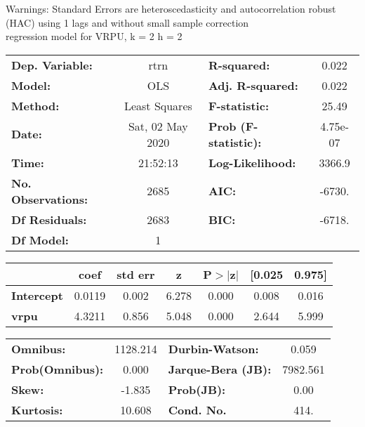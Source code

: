 Warnings: \newline
 [1] Standard Errors are heteroscedasticity and autocorrelation robust (HAC) using 1 lags and without small sample correction\\ 

regression model for VRPU, k = 2 h = 2\begin{center}
\begin{tabular}{lclc}
\toprule
\textbf{Dep. Variable:}    &       rtrn       & \textbf{  R-squared:         } &     0.022   \\
\textbf{Model:}            &       OLS        & \textbf{  Adj. R-squared:    } &     0.022   \\
\textbf{Method:}           &  Least Squares   & \textbf{  F-statistic:       } &     25.49   \\
\textbf{Date:}             & Sat, 02 May 2020 & \textbf{  Prob (F-statistic):} &  4.75e-07   \\
\textbf{Time:}             &     21:52:13     & \textbf{  Log-Likelihood:    } &    3366.9   \\
\textbf{No. Observations:} &        2685      & \textbf{  AIC:               } &    -6730.   \\
\textbf{Df Residuals:}     &        2683      & \textbf{  BIC:               } &    -6718.   \\
\textbf{Df Model:}         &           1      & \textbf{                     } &             \\
\bottomrule
\end{tabular}
\begin{tabular}{lcccccc}
                   & \textbf{coef} & \textbf{std err} & \textbf{z} & \textbf{P$> |$z$|$} & \textbf{[0.025} & \textbf{0.975]}  \\
\midrule
\textbf{Intercept} &       0.0119  &        0.002     &     6.278  &         0.000        &        0.008    &        0.016     \\
\textbf{vrpu}      &       4.3211  &        0.856     &     5.048  &         0.000        &        2.644    &        5.999     \\
\bottomrule
\end{tabular}
\begin{tabular}{lclc}
\textbf{Omnibus:}       & 1128.214 & \textbf{  Durbin-Watson:     } &    0.059  \\
\textbf{Prob(Omnibus):} &   0.000  & \textbf{  Jarque-Bera (JB):  } & 7982.561  \\
\textbf{Skew:}          &  -1.835  & \textbf{  Prob(JB):          } &     0.00  \\
\textbf{Kurtosis:}      &  10.608  & \textbf{  Cond. No.          } &     414.  \\
\bottomrule
\end{tabular}
\end{center}

